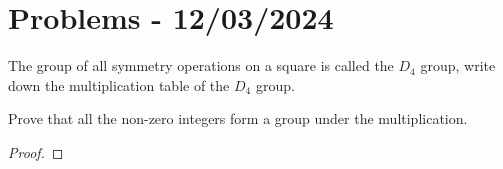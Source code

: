 \section*{Problems - 12/03/2024}

\begin{problem}
    The group of all symmetry operations on a square is called the $D_4$ group, write down the multiplication table of the $D_4$ group.
\end{problem}
\begin{solution}
    
\end{solution}

\begin{problem}
    Prove that all the non-zero integers form a group under the multiplication.
\end{problem}
\begin{solution}
\begin{proof}
    
\end{proof}
\end{solution}